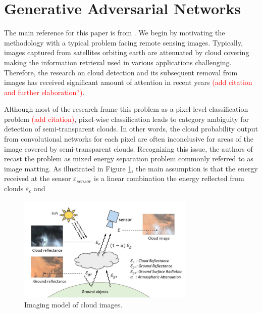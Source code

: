 \section{Generative Adversarial Networks } \label{sec:gan}

The main reference for this paper is from \cite{zou2019}. We begin by motivating the methodology with a typical problem facing remote sensing images. Typically, images captured from satellites orbiting earth are attenuated by cloud covering making the information retrieval used in various applications challenging. Therefore, the research on cloud detection and its subsequent removal from images has received significant amount of attention in recent years \textcolor{red}{(add citation and further elaboration?)}. 

Although most of the research frame this problem as a pixel-level classification problem \textcolor{red}{(add citation)}, pixel-wise classification leads to category ambiguity for detection of semi-transparent clouds. In other words, the cloud probability output from convolutional networks for each pixel are often inconclusive for areas of the image covered by semi-transparent clouds. Recognizing this issue, the authors of \cite{zou2019} recast the problem as mixed energy separation problem commonly referred to as image matting. As illustrated in Figure \ref{fig:image_matting}, the main assumption is that the energy received at the sensor $\varepsilon_{sensor}$ is a linear combination the energy reflected from clouds $\varepsilon_{c}$ and 

\begin{figure}[h]
\centering
\includegraphics[width=0.75\textwidth]{images/cloud_matting_image}
\caption{Imaging model of cloud images.}
\label{fig:image_matting}
\end{figure}